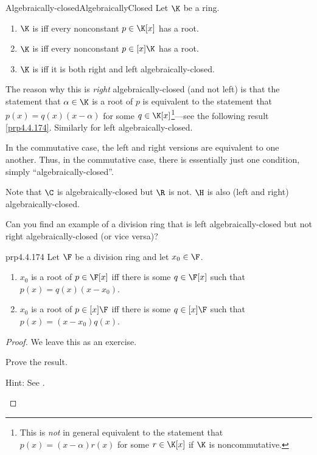 \begin{dfn}{Algebraically-closed}{AlgebraicallyClosed}
	Let $\K$ be a ring.
	\begin{enumerate}
		\item $\K$ is  iff every nonconstant $p\in \K [x]$ has a root.
		\item $\K$ is  iff every nonconstant $p\in [x]\K$ has a root.
		\item $\K$ is  iff it is both right and left algebraically-closed.
	\end{enumerate}
	\begin{rmk}
		The reason why this is \emph{right} algebraically-closed (and not left) is that the statement that $\alpha \in \K$ is a root of $p$ is equivalent to the statement that $p(x)=q(x)(x-\alpha )$ for some $q\in \K [x]$\footnote{This is \emph{not} in general equivalent to the statement that $p(x)=(x-\alpha )r(x)$ for some $r\in \K [x]$ if $\K$ is noncommutative.}---see the following result \cref{prp4.4.174}.  Similarly for left algebraically-closed.
	\end{rmk}
	\begin{rmk}
		In the commutative case, the left and right versions are equivalent to one another.  Thus, in the commutative case, there is essentially just one condition, simply ``algebraically-closed''.
	\end{rmk}
\end{dfn}
\begin{exm}{}{}
	Note that $\C$ is algebraically-closed but $\R$ is not.  $\H$ is also (left and right) algebraically-closed.
\end{exm}
\begin{exr}{}{}
	Can you find an example of a division ring that is left algebraically-closed but not right algebraically-closed (or vice versa)?
\end{exr}
\begin{prp}{}{prp4.4.174}
	Let $\F$ be a division ring and let $x_0\in \F$.
	\begin{enumerate}
		\item $x_0$ is a root of $p\in \F[x]$ iff there is some $q\in \F [x]$ such that $p(x)=q(x)(x-x_0)$.
		\item $x_0$ is a root of $p\in [x]\F$ iff there is some $q\in [x]\F$ such that $p(x)=(x-x_0)q(x)$.
	\end{enumerate}
	\begin{proof}
		We leave this as an exercise.
		\begin{exr}[breakable=false]{}{}
			Prove the result.
			\begin{rmk}
				Hint:  See \cite[Proposition 16.2]{Lam}.
			\end{rmk}
		\end{exr}
	\end{proof}
\end{prp}


